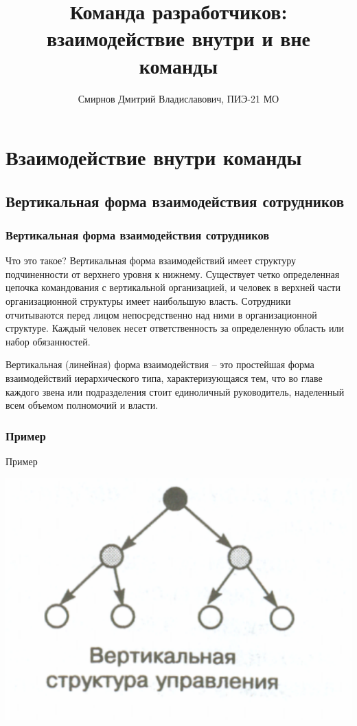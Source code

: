 \documentclass{industrial-development}
\title{Команда разработчиков: взаимодействие внутри и вне команды}
\author{Смирнов Дмитрий Владиславович, ПИЭ-21 МО}
\date{}
\begin{document}
\begin{frame}
  \titlepage
\end{frame}


\section{Взаимодействие внутри команды}

\subsection{Вертикальная форма взаимодействия сотрудников}

\begin{frame} \frametitle{Вертикальная форма взаимодействия сотрудников}
  \begin{block}{Что это такое?}
 Вертикальная форма взаимодействий имеет структуру подчиненности от верхнего уровня к нижнему. Существует четко определенная цепочка командования с вертикальной организацией, и человек в верхней части организационной структуры имеет наибольшую власть. Сотрудники отчитываются перед лицом непосредственно над ними в организационной структуре. Каждый человек несет ответственность за определенную область или набор обязанностей.
  \end{block}
\end{frame}

\lecturenotes
Вертикальная (линейная) форма взаимодействия –  это простейшая форма взаимодействий иерархического типа, характеризующаяся тем, что во главе каждого звена или подразделения стоит единоличный руководитель, наделенный всем объемом полномочий и власти. 

\begin{frame} \frametitle{Пример}
  \begin{block}{Пример}
\centerline{\includegraphics[width=1\textwidth]{vertical.pdf}}
  \end{block}
\end{frame}
\end{document}
